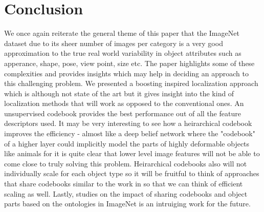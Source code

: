 \documentclass[10pt,twocolumn,letterpaper]{article}
\begin{document}




\section{Conclusion}

We once again reiterate the general theme of this paper that the ImageNet dataset
due to its sheer number of images per category is a very good approximation to
the true real world variability in object attributes such as apperance, shape,
pose, view point, size etc. The paper highlights some of these complexities
and provides insights which may help in deciding an approach
to this challenging problem. We presented a boosting inspired localization approach
which is although not state of the art but it gives insight into the kind of localization
methods that will work as opposed to the conventional ones. An unsupervised
codebook provides the best performance out of all the feature descriptors used. It may be
very interesting to see how a heirarchical codebook improves the efficiency - almost like
a deep belief network where the "codebook" of a higher layer could implicitly model the
parts of highly deformable objects like animals for it is quite clear that lower
level image features will not be able to come close to truly solving this problem. Heirarchical
codebooks also will not individually scale for each object type so it will be fruitful to think of approaches
that share codebooks similar to the work in \cite{multiview4} so that we can think of efficient
scaling as well. Lastly, studies on the impact of sharing codebooks and object parts based on the
ontologies in ImageNet is an intruiging work for the future.



{\small


}
\end{document}
